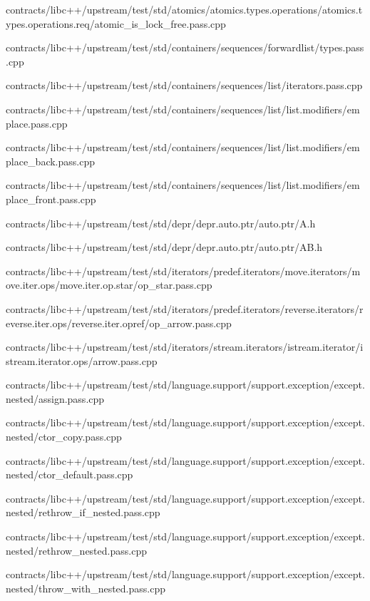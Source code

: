 \begin{DoxyCompactItemize}
contracts/libc++/upstream/test/std/atomics/atomics.\+types.\+operations/atomics.\+types.\+operations.\+req/atomic\+\_\+is\+\_\+lock\+\_\+free.\+pass.\+cpp\item 
contracts/libc++/upstream/test/std/containers/sequences/forwardlist/types.\+pass.\+cpp\item 
contracts/libc++/upstream/test/std/containers/sequences/list/iterators.\+pass.\+cpp\item 
contracts/libc++/upstream/test/std/containers/sequences/list/list.\+modifiers/emplace.\+pass.\+cpp\item 
contracts/libc++/upstream/test/std/containers/sequences/list/list.\+modifiers/emplace\+\_\+back.\+pass.\+cpp\item 
contracts/libc++/upstream/test/std/containers/sequences/list/list.\+modifiers/emplace\+\_\+front.\+pass.\+cpp\item 
contracts/libc++/upstream/test/std/depr/depr.\+auto.\+ptr/auto.\+ptr/A.\+h\item 
contracts/libc++/upstream/test/std/depr/depr.\+auto.\+ptr/auto.\+ptr/A\+B.\+h\item 
contracts/libc++/upstream/test/std/iterators/predef.\+iterators/move.\+iterators/move.\+iter.\+ops/move.\+iter.\+op.\+star/op\+\_\+star.\+pass.\+cpp\item 
contracts/libc++/upstream/test/std/iterators/predef.\+iterators/reverse.\+iterators/reverse.\+iter.\+ops/reverse.\+iter.\+opref/op\+\_\+arrow.\+pass.\+cpp\item 
contracts/libc++/upstream/test/std/iterators/stream.\+iterators/istream.\+iterator/istream.\+iterator.\+ops/arrow.\+pass.\+cpp\item 
contracts/libc++/upstream/test/std/language.\+support/support.\+exception/except.\+nested/assign.\+pass.\+cpp\item 
contracts/libc++/upstream/test/std/language.\+support/support.\+exception/except.\+nested/ctor\+\_\+copy.\+pass.\+cpp\item 
contracts/libc++/upstream/test/std/language.\+support/support.\+exception/except.\+nested/ctor\+\_\+default.\+pass.\+cpp\item 
contracts/libc++/upstream/test/std/language.\+support/support.\+exception/except.\+nested/rethrow\+\_\+if\+\_\+nested.\+pass.\+cpp\item 
contracts/libc++/upstream/test/std/language.\+support/support.\+exception/except.\+nested/rethrow\+\_\+nested.\+pass.\+cpp\item 
contracts/libc++/upstream/test/std/language.\+support/support.\+exception/except.\+nested/throw\+\_\+with\+\_\+nested.\+pass.\+cpp\item 

\end{DoxyCompactItemize}
